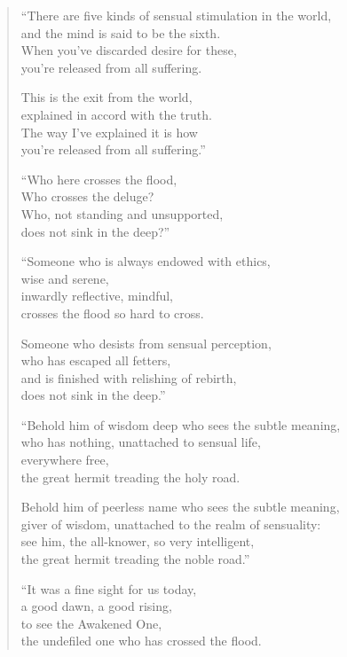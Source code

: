 \documentclass[12pt,openany]{book}%
\begin{document}
\begin{verse}
“There are five kinds of sensual stimulation in the world, \\
and the mind is said to be the sixth. \\
When you’ve discarded desire for these, \\
you’re released from all suffering. 

This is the exit from the world, \\
explained in accord with the truth. \\
The way I’ve explained it is how \\
you’re released from all suffering.” 

“Who here crosses the flood, \\
Who crosses the deluge? \\
Who, not standing and unsupported, \\
does not sink in the deep?” 

“Someone who is always endowed with ethics, \\
wise and serene, \\
inwardly reflective, mindful, \\
crosses the flood so hard to cross. 

Someone who desists from sensual perception, \\
who has escaped all fetters, \\
and is finished with relishing of rebirth, \\
does not sink in the deep.” 

“Behold him of wisdom deep who sees the subtle meaning, \\
who has nothing, unattached to sensual life, \\
everywhere free, \\
the great hermit treading the holy road. 

Behold him of peerless name who sees the subtle meaning, \\
giver of wisdom, unattached to the realm of sensuality: \\
see him, the all-knower, so very intelligent, \\
the great hermit treading the noble road.” 

“It was a fine sight for us today, \\
a good dawn, a good rising, \\
to see the Awakened One, \\
the undefiled one who has crossed the flood. 


\end{verse}
\end{document}

